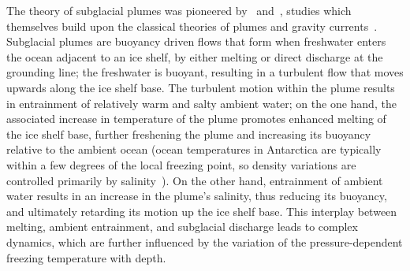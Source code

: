 \documentclass[openacc]{rsproca_new}%
\begin{document}
The theory of subglacial plumes was pioneered by~\citet{MacAyeal1985} and~\citet{Jenkins1991JGeophysResOceans}, studies which themselves build upon the classical theories of plumes and gravity currents~\citep[e.g.][]{Ellison1959JFM, Morton1956PRSL}. Subglacial plumes are buoyancy driven flows that form when freshwater enters the ocean adjacent to an ice shelf, by either melting or direct discharge at the grounding line; the freshwater is buoyant, resulting in a turbulent flow that moves upwards along the ice shelf base. The turbulent motion within the plume results in entrainment of relatively warm and salty ambient water; on the one hand, the associated increase in temperature of the plume promotes enhanced melting of the ice shelf base, further freshening the plume and increasing its buoyancy relative to the ambient ocean (ocean temperatures in Antarctica are typically within a few degrees of the local freezing point, so density variations are controlled primarily by salinity~\citep{Hewitt2020AnnRevFlu}). On the other hand, entrainment of ambient water results in an increase in the plume's salinity, thus reducing its buoyancy, and ultimately retarding its motion up the ice shelf base. This interplay between melting, ambient entrainment, and subglacial discharge leads to complex dynamics, which are further influenced by the variation of the pressure-dependent freezing temperature with depth. 
\end{document}
